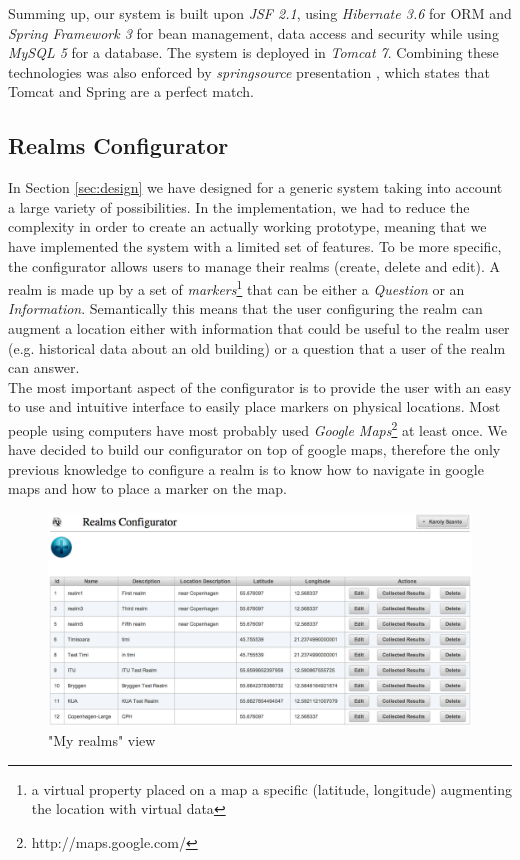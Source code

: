 \noindent Summing up, our system is built upon \emph{JSF 2.1}, using
\emph{Hibernate 3.6} for ORM and \emph{Spring Framework 3} for bean management, data access and
security while using \emph{MySQL 5} for a database. The system is deployed in
\emph{Tomcat 7}. Combining these technologies was also enforced by
\emph{springsource} presentation \cite{tomcat_spring}, which states that Tomcat
and Spring are a perfect match.

\subsection{Realms Configurator}
In Section \ref{sec:design} we have designed for a generic system taking into account a large variety of possibilities. In the implementation, we had to reduce the complexity in order to create an actually working prototype, meaning that we have implemented the system with a limited set of features. To be more specific, the configurator allows users to manage their realms (create, delete and edit). A realm is made up by a set of \emph{markers}\footnote{a virtual property placed on a map a specific (latitude, longitude) augmenting the location with virtual data} that can be either a \emph{Question} or an \emph{Information}. Semantically this means that the user configuring the realm can augment a location either with information that could be useful to the realm user (e.g. historical data about an old building)  or a question that a user of the realm can answer.\\

\noindent The most important aspect of the configurator is to provide the user with an easy to use and intuitive interface to easily place markers on physical locations. Most people using computers have most probably used \emph{Google Maps}\footnote{http://maps.google.com/} at least once. We have decided to build our configurator on top of google maps, therefore the only previous knowledge to configure a realm is to know how to navigate in google maps and how to place a marker on the map.\\
\begin{figure}[H] 
	\centering
	\includegraphics[width=\linewidth]{fig/my_realms.png}
	\caption{"My realms" view}
	\label{fig.my_realms}
\end{figure}

